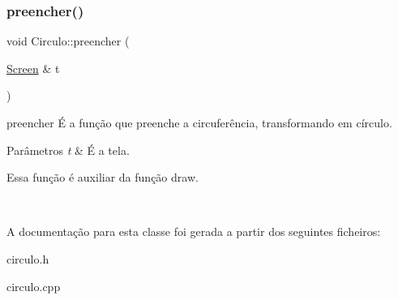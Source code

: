 \subsubsection{\texorpdfstring{preencher()}{preencher()}}
{\footnotesize\ttfamily void Circulo\+::preencher (\begin{DoxyParamCaption}\item[{\mbox{\hyperlink{class_screen}{Screen}} \&}]{t }\end{DoxyParamCaption})}



preencher É a função que preenche a circuferência, transformando em círculo. 


\begin{DoxyParams}{Parâmetros}
{\em t} & É a tela. 
\begin{DoxyPre}
Essa função é auxiliar da função draw.
\end{DoxyPre}
 \\
\hline
\end{DoxyParams}


A documentação para esta classe foi gerada a partir dos seguintes ficheiros\+:\begin{DoxyCompactItemize}
\item 
circulo.\+h\item 
circulo.\+cpp\end{DoxyCompactItemize}
